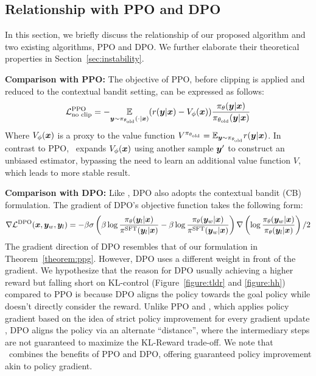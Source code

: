 \documentclass{article} %
\newcommand{\algn}{\text{P3O}}
\begin{document}
\subsection{Relationship with PPO and DPO}
In this section, we briefly discuss the relationship of our proposed algorithm and two existing algorithms, PPO and DPO. We further elaborate their theoretical properties in Section~\ref{sec:instability}.

\textbf{Comparison with PPO:} The objective of PPO, before clipping is applied and reduced to the contextual bandit setting, can be expressed as follows:
$$\mathcal{L}^{\text{PPO}}_{\text{no clip}} = -\underset{{\bm{y}}\sim\pi_{\theta_{\text{old}}}(\cdot|{\bm{x}})}{\mathbb{E}}(r({\bm{y}}|{\bm{x}})-V_\phi({\bm{x}}))\frac{\pi_\theta({\bm{y}}|{\bm{x}})}{\pi_{\theta_{\text{old}}}({\bm{y}}|{\bm{x}})}$$
Where $V_\phi({\bm{x}})$ is a proxy to the value function $V^{\pi_{\theta_{\text{old}}}} = \mathbb{E}_{{\bm{y}}\sim\pi_{\theta_{\text{old}}}}r({\bm{y}}|{\bm{x}})$. In contrast to PPO, \algn\ expands $V_\phi({\bm{x}})$ using another sample ${\bm{y}}'$ to construct an unbiased estimator, bypassing the need to learn an additional value function $V$, which leads to more stable result.

\textbf{Comparison with DPO:} Like \algn, DPO also adopts the contextual bandit (CB) formulation. The gradient of DPO's objective function takes the following form:
\begin{align*}
    \nabla\mathcal{L}^{\text{DPO}}({\bm{x}},{\bm{y}}_w,{\bm{y}}_l) = -\beta\sigma\left(\beta\log \frac{\pi_\theta({\bm{y}}_l|{\bm{x}})}{\pi^{\text{SFT}}({\bm{y}}_l|{\bm{x}})} - \beta\log \frac{\pi_\theta({\bm{y}}_w|{\bm{x}})}{\pi^{\text{SFT}}({\bm{y}}_w|{\bm{x}})} \right)\nabla\left(\log\frac{\pi_\theta({\bm{y}}_w|{\bm{x}})}{\pi_\theta({\bm{y}}_l|{\bm{x}})}\right)/2
\end{align*}
The gradient direction of DPO resembles that of our formulation in Theorem~\ref{theorem:ppg}. However, DPO uses a different weight in front of the gradient. We hypothesize that the reason for DPO usually achieving a higher reward but falling short on KL-control (Figure~\ref{figure:tldr} and \ref{figure:hh}) compared to PPO is because DPO aligns the policy towards the goal policy while doesn't directly consider the reward. Unlike PPO and \algn, which applies policy gradient based on the idea of strict policy improvement for every gradient update \citep{schulman2015trust}, DPO aligns the policy via an alternate ``distance'', where the intermediary steps are not guaranteed to maximize the KL-Reward trade-off. We note that \algn\ combines the benefits of PPO and DPO, offering guaranteed policy improvement akin to policy gradient.
\end{document}
